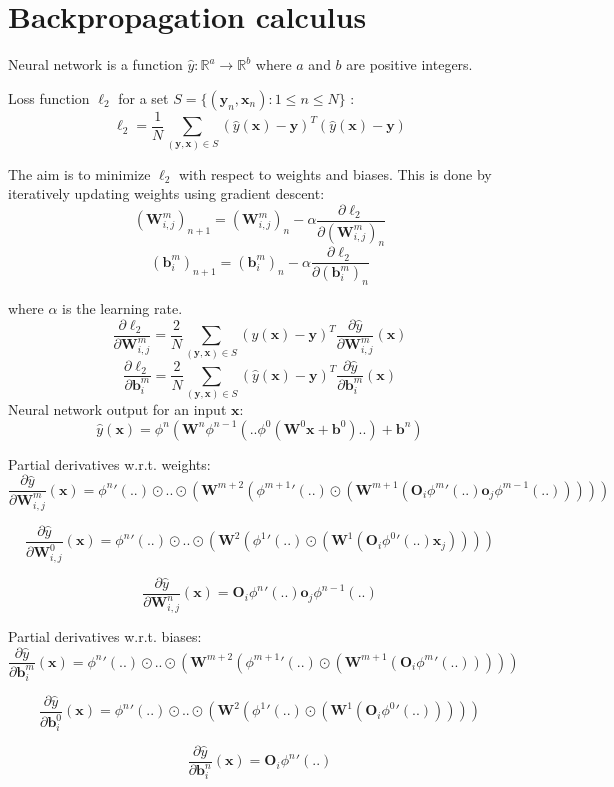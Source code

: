 \documentclass{article}
\begin{document}
\section{Backpropagation calculus}

Neural network is a function $\hat{y}: \mathbb{R}^a \rightarrow \mathbb{R}^b$ where $a$ and $b$ are positive integers.

\noindent 
Loss function $\ell_2$ for a set $S = \{(\textbf{y}_n, \textbf{x}_n) : 1 \le n \le N\}$ :
$$\ell_2 = \frac{1}{N}\sum_{(\textbf{y},\textbf{x})\in S}(\hat{y}(\textbf{x})-\textbf{y})^T(\hat{y}(\textbf{x})-\textbf{y})$$

\noindent 
The aim is to minimize $\ell_2$ with respect to weights and biases. This is done by iteratively updating weights using gradient descent:
$$(\textbf{W}^m_{i,j})_{n+1} = (\textbf{W}^m_{i,j})_{n} - \alpha\frac{\partial \ell_2}{\partial(\textbf{W}^m_{i,j})_{n}}$$
$$(\textbf{b}^m_{i})_{n+1} = (\textbf{b}^m_{i})_{n} - \alpha\frac{\partial \ell_2}{\partial(\textbf{b}^m_{i})_{n}}$$

\noindent
where $\alpha$ is the learning rate.
$$\frac{\partial \ell_2}{\partial\textbf{W}^m_{i,j}} = \frac{2}{N}\sum_{(\textbf{y},\textbf{x})\in S}(\hat{y}(\textbf{x})-\textbf{y})^T\frac{\partial \hat{y}}{\partial \textbf{W}^m_{i,j}}(\textbf{x})$$
$$\frac{\partial \ell_2}{\partial\textbf{b}^m_{i}} = \frac{2}{N}\sum_{(\textbf{y},\textbf{x})\in S}(\hat{y}(\textbf{x})-\textbf{y})^T\frac{\partial \hat{y}}{\partial \textbf{b}^m_{i}}(\textbf{x})$$
\noindent 
Neural network output for an input $\textbf{x}$:
$$\hat{y}(\textbf{x})=\phi^n(\textbf{W}^n\phi^{n-1}(..\phi^{0}(\textbf{W}^0\textbf{x}+\textbf{b}^0)..)+\textbf{b}^n)$$

\noindent 
Partial derivatives w.r.t. weights:
$$\frac{\partial \hat{y}}{\partial \textbf{W}^m_{i,j}}(\textbf{x})={\phi^n}'(..)\odot..\odot(\textbf{W}^{m+2}({\phi^{m+1}}'(..)\odot(\textbf{W}^{m+1}(\textbf{O}_i{\phi^{m}}'(..)\textbf{o}_j\phi^{m-1}(..)))))$$

$$\frac{\partial \hat{y}}{\partial \textbf{W}^0_{i,j}}(\textbf{x})={\phi^n}'(..)\odot..\odot(\textbf{W}^{2}({\phi^{1}}'(..)\odot(\textbf{W}^{1}(\textbf{O}_i{\phi^{0}}'(..)\textbf{x}_j))))$$

$$\frac{\partial \hat{y}}{\partial \textbf{W}^n_{i,j}}(\textbf{x})=\textbf{O}_i{\phi^{n}}'(..)\textbf{o}_j\phi^{n-1}(..)$$

\noindent 
Partial derivatives w.r.t. biases:
$$\frac{\partial \hat{y}}{\partial \textbf{b}^m_{i}}(\textbf{x})={\phi^n}'(..)\odot..\odot(\textbf{W}^{m+2}({\phi^{m+1}}'(..)\odot(\textbf{W}^{m+1}(\textbf{O}_i{\phi^{m}}'(..)))))$$

$$\frac{\partial \hat{y}}{\partial \textbf{b}^0_{i}}(\textbf{x})={\phi^n}'(..)\odot..\odot(\textbf{W}^{2}({\phi^{1}}'(..)\odot(\textbf{W}^{1}(\textbf{O}_i{\phi^{0}}'(..)))))$$

$$\frac{\partial \hat{y}}{\partial \textbf{b}^n_{i}}(\textbf{x})=\textbf{O}_i{\phi^{n}}'(..)$$
\end{document}
